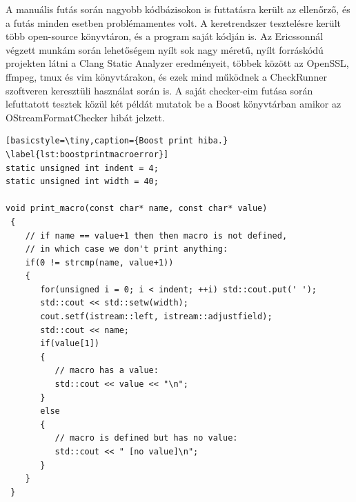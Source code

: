 \documentclass[a4paper,12pt]{report}
\begin{document}
A manuális futás során nagyobb kódbázisokon is futtatásra került az ellenőrző, és a futás minden esetben problémamentes volt. A keretrendszer tesztelésre került több open-source könyvtáron, és a program saját kódján is. Az Ericssonnál végzett munkám során lehetőségem nyílt sok nagy méretű, nyílt forráskódú projekten látni a Clang Static Analyzer eredményeit, többek között az OpenSSL, ffmpeg, tmux és vim könyvtárakon, és ezek mind működnek a CheckRunner szoftveren keresztüli használat során is. A saját checker-eim futása során lefuttatott tesztek közül két példát mutatok be a Boost könyvtárban amikor az OStreamFormatChecker hibát jelzett.

\begin{lstlisting}[basicstyle=\tiny,caption={Boost print hiba.}
\label{lst:boostprintmacroerror}]
static unsigned int indent = 4;
static unsigned int width = 40;

void print_macro(const char* name, const char* value)
 {
    // if name == value+1 then then macro is not defined,
    // in which case we don't print anything:
    if(0 != strcmp(name, value+1))
    {
       for(unsigned i = 0; i < indent; ++i) std::cout.put(' ');
       std::cout << std::setw(width);
       cout.setf(istream::left, istream::adjustfield);
       std::cout << name;
       if(value[1])
       {
          // macro has a value:
          std::cout << value << "\n";
       }
       else
       {
          // macro is defined but has no value:
          std::cout << " [no value]\n";
       }
    }
 }
\end{lstlisting}
\end{document}
